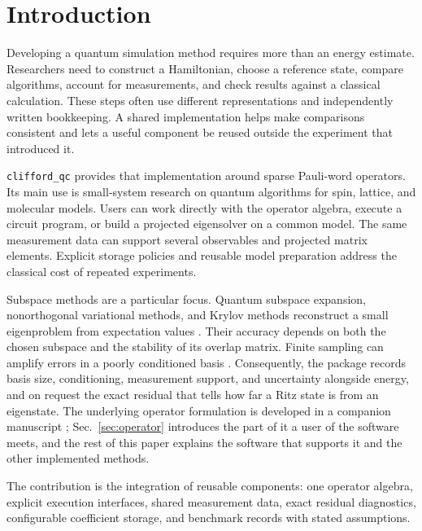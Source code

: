 \documentclass[aps,pra,reprint,superscriptaddress,nofootinbib,floatfix,
  showkeys]{revtex4-2}
\newcommand{\pkg}{\texttt{clifford\_qc}}
\begin{document}
\maketitle

\section{Introduction}
\label{sec:introduction}

Developing a quantum simulation method requires more than an energy estimate.
Researchers need to construct a Hamiltonian, choose a reference state, compare
algorithms, account for measurements, and check results against a classical
calculation. These steps often use different representations and independently
written bookkeeping. A shared implementation helps make comparisons consistent
and lets a useful component be reused outside the experiment that introduced it.

\pkg{} provides that implementation around sparse Pauli-word operators. Its
main use is small-system research on quantum algorithms for spin, lattice, and
molecular models. Users can work directly with the operator algebra, execute a
circuit program, or build a projected eigensolver on a common model. The same
measurement data can support several observables and projected matrix elements.
Explicit storage policies and reusable model preparation address the classical
cost of repeated experiments.

Subspace methods are a particular focus. Quantum subspace expansion,
nonorthogonal variational methods, and Krylov methods reconstruct a small
eigenproblem from expectation values
\cite{mcclean2017qse,huggins2020nonorthogonal,stair2020krylov}.
Their accuracy depends on both the chosen subspace and the stability of its
overlap matrix. Finite sampling can amplify errors in a poorly conditioned
basis \cite{epperly2022theory,lee2024sampling,zhang2024measurement}.
Consequently, the package records basis size, conditioning, measurement support,
and uncertainty alongside energy, and on request the exact residual that tells
how far a Ritz state is from an eigenstate. The underlying operator formulation
is developed in a companion manuscript \cite{utama2026operatorcentric};
Sec.~\ref{sec:operator} introduces the part of it a user of the software meets,
and the rest of this paper explains the software that supports it and the other
implemented methods.

The contribution is the integration of reusable components: one operator
algebra, explicit execution interfaces, shared measurement data, exact residual
diagnostics, configurable coefficient storage, and benchmark records with stated
assumptions.
\end{document}
